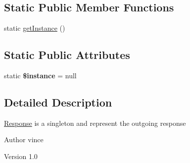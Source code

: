 \subsection*{Static Public Member Functions}
\begin{DoxyCompactItemize}
\item 
static \hyperlink{class_anemo_1_1_application_1_1_http_1_1_response_ac93fbec81f07e5d15f80db907e63dc10}{getInstance} ()
\end{DoxyCompactItemize}
\subsection*{Static Public Attributes}
\begin{DoxyCompactItemize}
\item 
\hypertarget{class_anemo_1_1_application_1_1_http_1_1_response_ad9d7ce33ebb142b70e58b68052ca0ea8}{
static {\bfseries \$instance} = null}
\label{class_anemo_1_1_application_1_1_http_1_1_response_ad9d7ce33ebb142b70e58b68052ca0ea8}

\end{DoxyCompactItemize}


\subsection{Detailed Description}
\hyperlink{class_anemo_1_1_application_1_1_http_1_1_response}{Response} is a singleton and represent the outgoing response \begin{DoxyAuthor}{Author}
vince 
\end{DoxyAuthor}
\begin{DoxyVersion}{Version}
1.0 
\end{DoxyVersion}


